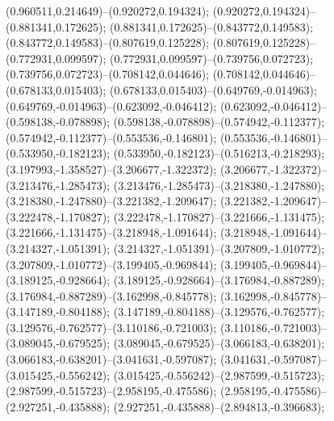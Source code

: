  (0.960511,0.214649)--(0.920272,0.194324);
 (0.920272,0.194324)--(0.881341,0.172625);
 (0.881341,0.172625)--(0.843772,0.149583);
 (0.843772,0.149583)--(0.807619,0.125228);
 (0.807619,0.125228)--(0.772931,0.099597);
 (0.772931,0.099597)--(0.739756,0.072723);
 (0.739756,0.072723)--(0.708142,0.044646);
 (0.708142,0.044646)--(0.678133,0.015403);
 (0.678133,0.015403)--(0.649769,-0.014963);
 (0.649769,-0.014963)--(0.623092,-0.046412);
 (0.623092,-0.046412)--(0.598138,-0.078898);
 (0.598138,-0.078898)--(0.574942,-0.112377);
 (0.574942,-0.112377)--(0.553536,-0.146801);
 (0.553536,-0.146801)--(0.533950,-0.182123);
 (0.533950,-0.182123)--(0.516213,-0.218293);
 (3.197993,-1.358527)--(3.206677,-1.322372);
 (3.206677,-1.322372)--(3.213476,-1.285473);
 (3.213476,-1.285473)--(3.218380,-1.247880);
 (3.218380,-1.247880)--(3.221382,-1.209647);
 (3.221382,-1.209647)--(3.222478,-1.170827);
 (3.222478,-1.170827)--(3.221666,-1.131475);
 (3.221666,-1.131475)--(3.218948,-1.091644);
 (3.218948,-1.091644)--(3.214327,-1.051391);
 (3.214327,-1.051391)--(3.207809,-1.010772);
 (3.207809,-1.010772)--(3.199405,-0.969844);
 (3.199405,-0.969844)--(3.189125,-0.928664);
 (3.189125,-0.928664)--(3.176984,-0.887289);
 (3.176984,-0.887289)--(3.162998,-0.845778);
 (3.162998,-0.845778)--(3.147189,-0.804188);
 (3.147189,-0.804188)--(3.129576,-0.762577);
 (3.129576,-0.762577)--(3.110186,-0.721003);
 (3.110186,-0.721003)--(3.089045,-0.679525);
 (3.089045,-0.679525)--(3.066183,-0.638201);
 (3.066183,-0.638201)--(3.041631,-0.597087);
 (3.041631,-0.597087)--(3.015425,-0.556242);
 (3.015425,-0.556242)--(2.987599,-0.515723);
 (2.987599,-0.515723)--(2.958195,-0.475586);
 (2.958195,-0.475586)--(2.927251,-0.435888);
 (2.927251,-0.435888)--(2.894813,-0.396683);
